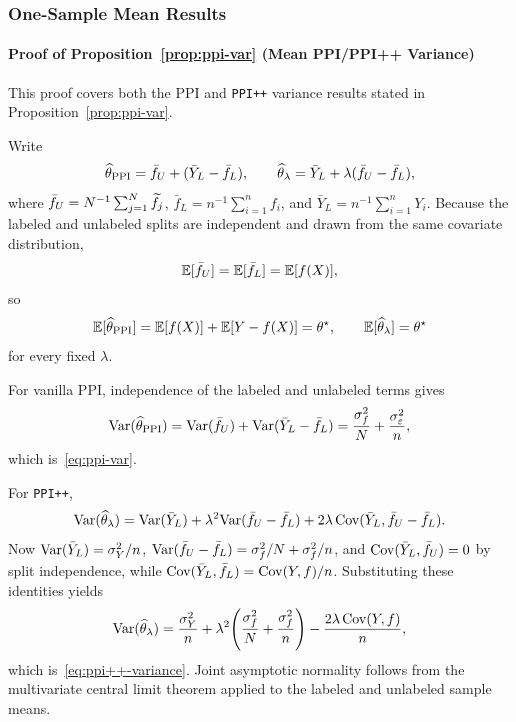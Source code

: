 

\subsubsection{One-Sample Mean Results}
\label{sec:proofs-one-sample}

\paragraph{Proof of Proposition~\ref{prop:ppi-var} (Mean PPI/PPI++ Variance)}
\label{sec:proof-vanilla-var}
This proof covers both the PPI and \texttt{PPI++} variance results stated in Proposition~\ref{prop:ppi-var}.

Write
\[
\widehat{\theta}_{\mathrm{PPI}}
= \bar f_U + (\bar Y_L-\bar f_L),
\qquad
\widehat{\theta}_\lambda
= \bar Y_L + \lambda(\bar f_U-\bar f_L),
\]
where $\bar f_U = N^{-1}\sum_{j=1}^N \widetilde f_j$,
$\bar f_L = n^{-1}\sum_{i=1}^n f_i$, and
$\bar Y_L = n^{-1}\sum_{i=1}^n Y_i$.
Because the labeled and unlabeled splits are independent and drawn from the
same covariate distribution,
\[
\mathbb{E}[\bar f_U]=\mathbb{E}[\bar f_L]=\mathbb{E}[f(X)],
\]
so
\[
\mathbb{E}[\widehat{\theta}_{\mathrm{PPI}}]
= \mathbb{E}[f(X)] + \mathbb{E}[Y-f(X)]
= \theta^\star,
\qquad
\mathbb{E}[\widehat{\theta}_\lambda]=\theta^\star
\]
for every fixed $\lambda$.

For vanilla PPI, independence of the labeled and unlabeled terms gives
\[
\mathrm{Var}(\widehat{\theta}_{\mathrm{PPI}})
= \mathrm{Var}(\bar f_U) + \mathrm{Var}(\bar Y_L-\bar f_L)
= \frac{\sigma_f^2}{N} + \frac{\sigma_\varepsilon^2}{n},
\]
which is~\eqref{eq:ppi-var}.

For \texttt{PPI++},
\[
\mathrm{Var}(\widehat{\theta}_\lambda)
= \mathrm{Var}(\bar Y_L) + \lambda^2\mathrm{Var}(\bar f_U-\bar f_L)
+ 2\lambda\,\mathrm{Cov}(\bar Y_L,\bar f_U-\bar f_L).
\]
Now $\mathrm{Var}(\bar Y_L)=\sigma_Y^2/n$,
$\mathrm{Var}(\bar f_U-\bar f_L)=\sigma_f^2/N+\sigma_f^2/n$, and
$\mathrm{Cov}(\bar Y_L,\bar f_U)=0$ by split independence, while
$\mathrm{Cov}(\bar Y_L,\bar f_L)=\mathrm{Cov}(Y,f)/n$.
Substituting these identities yields
\[
\mathrm{Var}(\widehat{\theta}_\lambda)
=
\frac{\sigma_Y^2}{n}
+ \lambda^2\!\left(\frac{\sigma_f^2}{N}+\frac{\sigma_f^2}{n}\right)
- \frac{2\lambda\,\mathrm{Cov}(Y,f)}{n},
\]
which is~\eqref{eq:ppi++-variance}. Joint asymptotic normality follows from the
multivariate central limit theorem applied to the labeled and unlabeled sample
means.

